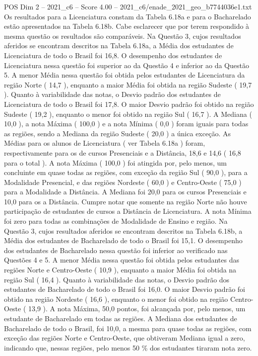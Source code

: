\begin{textsample}{POS Dim 2 – 2021\_c6 – Score 4.00 – 2021\_c6/enade\_2021\_geo\_b7744036e1.txt}
Os resultados para a Licenciatura constam da Tabela 6.18a e para o Bacharelado estão apresentados na Tabela 6.18b.
Cabe esclarecer que por terem respondido à mesma questão os resultados são comparáveis.
Na Questão 3, cujos resultados aferidos se encontram descritos na Tabela 6.18a, a Média dos estudantes de Licenciatura de todo o Brasil foi 16,8.
O desempenho dos estudantes de Licenciatura nessa questão foi superior ao da Questão 4 e inferior ao da Questão 5.
A menor Média nessa questão foi obtida pelos estudantes de Licenciatura da região Norte ( 14,7 ), enquanto a maior Média foi obtida na região Sudeste ( 19,7 ).
Quanto à variabilidade das notas, o Desvio padrão dos estudantes de Licenciatura de todo o Brasil foi 17,8.
O maior Desvio padrão foi obtido na região Sudeste ( 19,2 ), enquanto o menor foi obtido na região Sul ( 16,7 ).
A Mediana ( 10,0 ), a nota Máxima ( 100,0 ) e a nota Mínima ( 0,0 ) foram iguais para todas as regiões, sendo a Mediana da região Sudeste ( 20,0 ) a única exceção.
As Médias para os alunos de Licenciatura ( ver Tabela 6.18a ) foram, respectivamente para os de cursos Presenciais e a Distância, 18,6 e 14,6 ( 16,8 para o total ).
A nota Máxima ( 100,0 ) foi atingida por, pelo menos, um concluinte em quase todas as regiões, com exceção da região Sul ( 90,0 ), para a Modalidade Presencial, e das regiões Nordeste ( 60,0 ) e Centro-Oeste ( 75,0 ) para a Modalidade a Distância.
A Mediana foi 20,0 para os cursos Presenciais e 10,0 para os a Distância.
Cumpre notar que somente na região Norte não houve participação de estudantes de cursos a Distância de Licenciatura.
A nota Mínima foi zero para todas as combinações de Modalidade de Ensino e região.
Na Questão 3, cujos resultados aferidos se encontram descritos na Tabela 6.18b, a Média dos estudantes de Bacharelado de todo o Brasil foi 15,1.
O desempenho dos estudantes de Bacharelado nessa questão foi inferior ao verificado nas Questões 4 e 5.
A menor Média nessa questão foi obtida pelos estudantes das regiões Norte e Centro-Oeste ( 10,9 ), enquanto a maior Média foi obtida na região Sul ( 16,4 ).
Quanto à variabilidade das notas, o Desvio padrão dos estudantes de Bacharelado de todo o Brasil foi 16,0.
O maior Desvio padrão foi obtido na região Nordeste ( 16,6 ), enquanto o menor foi obtido na região Centro-Oeste ( 13,9 ).
A nota Máxima, 50,0 pontos, foi alcançada por, pelo menos, um estudante de Bacharelado em todas as regiões.
A Mediana dos estudantes de Bacharelado de todo o Brasil, foi 10,0, a mesma para quase todas as regiões, com exceção das regiões Norte e Centro-Oeste, que obtiveram Mediana igual a zero, indicando que, nessas regiões, pelo menos 50 \% dos estudantes tiraram nota zero.

\end{textsample}
